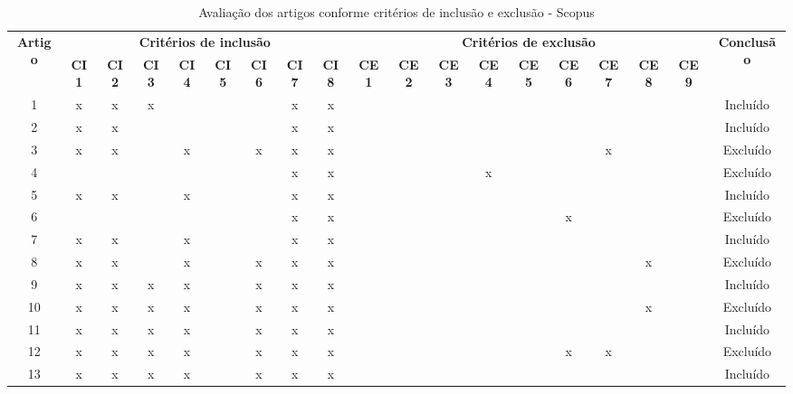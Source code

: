 \documentclass[
	12pt,				%
	oneside,			%
	a4paper,			%
	english,			%
	brazil				%
	]{abntex2ppgsi}
\begin{document}
\begin{apendicesenv}
\begin{table}[H]
\centering
\caption{Avaliação dos artigos conforme critérios de inclusão e exclusão - Scopus}
\label{tab:critincluexclu} 
\setlength{\tabcolsep}{1.5pt} %
\footnotesize %
\begin{tabular}{c | c c c c c c c c | c c c c c c c c c | c}
\toprule
    \multirow{2}{*}{\textbf{Artigo}} & 
    \multicolumn{8}{c|}{\textbf{Critérios de inclusão}} &
    \multicolumn{9}{c|}{\textbf{Critérios de exclusão}} &
    \multirow{2}{*}{\textbf{Conclusão}} \\ 
    \cline{2-18}
 & \tiny\textbf{CI1} & \tiny\textbf{CI2} & \tiny\textbf{CI3} & \tiny\textbf{CI4} & \tiny\textbf{CI5} & \tiny\textbf{CI6} & \tiny\textbf{CI7} & \tiny\textbf{CI8} & \tiny\textbf{CE1} & \tiny\textbf{CE2} & \tiny\textbf{CE3} & \tiny\textbf{CE4} & \tiny\textbf{CE5} & \tiny\textbf{CE6} & \tiny\textbf{CE7} & \tiny\textbf{CE8} & \tiny\textbf{CE9} & \\
\midrule
 1 & x & x & x &   &   &   & x & x &   &   &   &   &   &   &   &   &   & Incluído \\
 2 & x & x &   &   &   &   & x & x &   &   &   &   &   &   &   &   &   & Incluído \\
 3 & x & x &   & x &   & x & x & x &   &   &   &   &   &   & x &   &   & Excluído \\
 4 &   &   &   &   &   &   & x & x &   &   &   & x &   &   &   &   &   & Excluído \\
 5 & x & x &   & x &   &   & x & x &   &   &   &   &   &   &   &   &   & Incluído \\
 6 &   &   &   &   &   &   & x & x &   &   &   &   &   & x &   &   &   & Excluído \\
 7 & x & x &   & x &   &   & x & x &   &   &   &   &   &   &   &   &   & Incluído \\
 8 & x & x &   & x &   & x & x & x &   &   &   &   &   &   &   & x &   & Excluído \\
 9 & x & x & x & x &   & x & x & x &   &   &   &   &   &   &   &   &   & Incluído \\
10 & x & x & x & x &   & x & x & x &   &   &   &   &   &   &   & x &   & Excluído \\
11 & x & x & x & x &   & x & x & x &   &   &   &   &   &   &   &   &   & Incluído \\
12 & x & x & x & x &   & x & x & x &   &   &   &   &   & x & x &   &   & Excluído \\
13 & x & x & x & x &   & x & x & x &   &   &   &   &   &   &   &   &   & Incluído \\

\end{tabular}
\end{table}
\end{apendicesenv}
\end{document}
